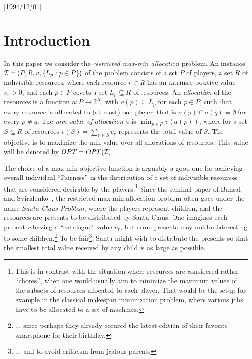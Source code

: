 \NeedsTeXFormat{LaTeX2e}[1994/12/01]\documentclass[letterpaper, 11pt]{article}
\theoremstyle{definition}
\theoremstyle{remark}
\numberwithin{equation}{section}
\begin{document}
\thispagestyle{empty}

\newpage

\setcounter{page}{1}

\section{Introduction} \label{sec:introduction}

In this paper
we consider the {\em restricted max-min allocation} problem.
An instance ${\cal I} = (P, R , v, \{L_p : p\in P\})$ of the problem
  consists of 
  a set $P$ of players, a set $R$ of indivisible resources,
  where each resource $r \in R$ has an intrinsic positive value
$v_r >0$, and each $p\in P$ covets a set $L_p\subseteq R$ of resources.
An {\em allocation} of the resources is a function $a: P\rightarrow
2^R$, with $a(p)\subseteq L_p$ for each $p\in P$, such that every resource is allocated to (at most) one player, that is $a (p)
\cap a(q) =\emptyset$ for every $p\neq q$.
The {\em min-value of allocation $a$} is $\min_{p\in P} v(a(p))$,
where for a set $S\subseteq R$ of resources
$v(S) = \sum_{r\in S}v_r$ represents the total value of $S$.
The objective is to maximize the min-value over all allocations of
resources. This value will be denoted by $OPT = OPT({\cal I})$.

The choice of a max-min
objective function is arguably a good one for
achieving overall individual ``Fairness'' in the
distribution of a set of indivisible resources
that are considered desirable by the players.\footnote{This is in contrast with the situation where resources are 
considered rather ``chores'', when one would usually aim to minimize the
maximum values of the subsets of resources allocated to each player.
That would be the 
setup for example in the classical makespan minimization problem, where
various jobs have to be allocated to a set of machines.} 
Since the seminal paper of Bansal and Sviridenko~\cite{bansalsviridenko}, the restricted max-min allocation
problem often goes under the name {\em Santa Claus Problem},
where the players represent children, and the resources are presents
to be distributed by Santa Claus. One imagines each
present $r$ having a ``catalogue'' value $v_r$, but some presents may
not be interesting to some children.\footnote{... since perhaps
 they already secured the
latest edition of their favorite smartphone for their birthday.} To be
fair\footnote{... and to avoid criticism from jealous parents},
Santa might wish to distribute
the presents so that the smallest total value received by any child is
as large as possible. 
\end{document}
